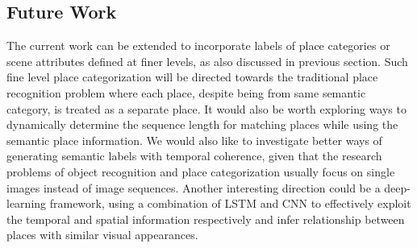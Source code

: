 \documentclass[letterpaper, 10 pt, conference]{ieeeconf}  %
\begin{document}
\subsection{Future Work}
The current work can be extended to incorporate labels of place categories or scene attributes defined at finer levels, as also discussed in previous section. Such fine level place categorization will be directed towards the traditional place recognition problem where each place, despite being from same semantic category, is treated as a separate place. It would also be worth exploring ways to dynamically determine the sequence length for matching places while using the semantic place information.  We would also like to investigate better ways of generating semantic labels with temporal coherence, given that the research problems of object recognition and place categorization usually focus on single images instead of image sequences. Another interesting direction could be a deep-learning framework, using a combination of LSTM and CNN to effectively exploit the temporal and spatial information respectively and infer relationship between places with similar visual appearances.









\end{document}
